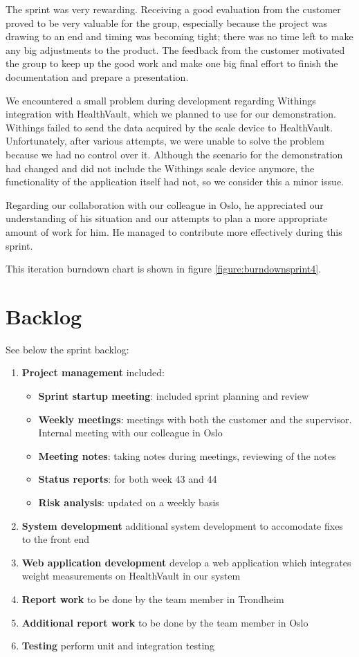 The sprint was very rewarding.
Receiving a good evaluation from the customer proved to be very valuable for the group,
especially because the project was drawing to an end and timing was becoming tight;
there was no time left to make any big adjustments to the product.
The feedback from the customer motivated the group to keep up the good work
and make one big final effort to finish the documentation and prepare a presentation.

We encountered a small problem during development regarding Withings integration with HealthVault,
which we planned to use for our demonstration. Withings failed to send the data acquired
by the scale device to HealthVault. Unfortunately, after various attempts, we were unable to
solve the problem because we had no control over it.
Although the scenario for the demonstration had changed and did not include
the Withings scale device anymore, the functionality of the application itself
had not, so we consider this a minor issue.

Regarding our collaboration with our colleague in Oslo, he appreciated
our understanding of his situation and our attempts to plan a more
appropriate amount of work for him. He managed to contribute
more effectively during this sprint.

This iteration burndown chart is shown in figure \ref{figure:burndownsprint4}.


\section{Backlog}
See below the sprint backlog:
\begin{enumerate}[1.]
\item \textbf{Project management} included:
	\begin{itemize}
		\item \textbf{Sprint startup meeting}:
			included sprint planning and review
		\item \textbf{Weekly meetings}: 
			meetings with both the customer and the supervisor. Internal meeting with our colleague in Oslo
		\item \textbf{Meeting notes}:
			taking notes during meetings, reviewing of the notes
		\item \textbf{Status reports}:
			for both week 43 and 44
		\item \textbf{Risk analysis}:
			updated on a weekly basis
	\end{itemize}
	\item \textbf{System development}
		additional system development to accomodate fixes to the front end
	\item \textbf{Web application development}
		develop a web application which integrates weight measurements
		on HealthVault in our system
	\item \textbf{Report work}
		to be done by the team member in Trondheim
	\item \textbf{Additional report work}
		to be done by the team member in Oslo
	\item \textbf{Testing}
		perform unit and integration testing
\end{enumerate}

